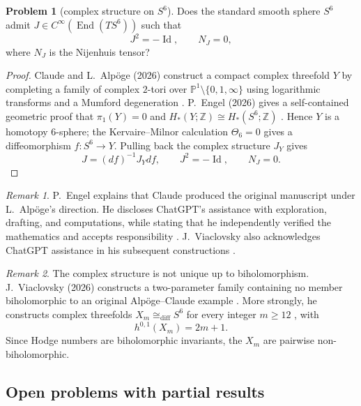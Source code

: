 \documentclass[11pt,reqno]{amsart}
\DeclareMathOperator{\Id}{Id}
\theoremstyle{definition}
\newtheorem{problem}{Problem}[section]
\theoremstyle{remark}
\newtheorem*{remark}{Remark}
\begin{document}
\begin{problem}[complex structure on $S^6$]\label{Siu-1.2}
Does the standard smooth sphere $S^6$ admit $J\in C^\infty(\operatorname{End}(TS^6))$ such that
\[
J^2=-\Id,\qquad N_J=0,
\]
where $N_J$ is the Nijenhuis tensor?
\end{problem}
\begin{proof}
Claude and L.~Alp\"oge (2026) construct a compact complex threefold $Y$ by completing a family of complex $2$-tori over $\mathbb P^1\setminus\{0,1,\infty\}$ using logarithmic transforms and a Mumford degeneration \cite{SIU-AC26}. P.~Engel (2026) gives a self-contained geometric proof that $\pi_1(Y)=0$ and $H_*(Y;\mathbb Z)\cong H_*(S^6;\mathbb Z)$ \cite[Theorem~4.1]{SIU-Eng26}. Hence $Y$ is a homotopy $6$-sphere; the Kervaire--Milnor calculation $\Theta_6=0$ gives a diffeomorphism $f:S^6\to Y$. Pulling back the complex structure $J_Y$ gives
\[
J=(df)^{-1}J_Ydf,\qquad J^2=-\Id,\qquad N_J=0.
\]
\end{proof}
\begin{remark}
P.~Engel explains that Claude produced the original manuscript under L.~Alp\"oge's direction. He discloses ChatGPT's assistance with exploration, drafting, and computations, while stating that he independently verified the mathematics and accepts responsibility \cite[\S\S1.3--1.4]{SIU-Eng26}. J.~Viaclovsky also acknowledges ChatGPT assistance in his subsequent constructions \cite{SIU-Via26a,SIU-Via26b}.
\end{remark}
\begin{remark}
The complex structure is not unique up to biholomorphism. J.~Viaclovsky (2026) constructs a two-parameter family containing no member biholomorphic to an original Alp\"oge--Claude example \cite[Theorem~1.1(iv)]{SIU-Via26a}. More strongly, he constructs complex threefolds $X_m\cong_{\mathrm{diff}}S^6$ for every integer $m\geq12$ \cite[Theorem~1.1]{SIU-Via26b}, with
\[
h^{0,1}(X_m)=2m+1.
\]
Since Hodge numbers are biholomorphic invariants, the $X_m$ are pairwise non-biholomorphic.
\end{remark}

\subsection{Open problems with partial results}
\end{document}

